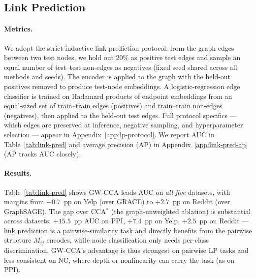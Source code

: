 \documentclass{article}
\begin{document}
\subsection{Link Prediction}
\paragraph{Metrics.}
We adopt the strict-inductive link-prediction protocol: from the graph
edges between two test nodes, we hold out 20\% as positive test edges
and sample an equal number of test--test non-edges as negatives (fixed
seed shared across all methods and seeds). The encoder is applied to the
graph with the held-out positives removed to produce test-node
embeddings. A logistic-regression edge classifier is trained on Hadamard
products of endpoint embeddings from an equal-sized set of train--train
edges (positives) and train--train non-edges (negatives), then applied
to the held-out test edges. Full protocol specifics --- which edges are
preserved at inference, negative sampling, and hyperparameter selection
--- appear in Appendix~\ref{app:lp-protocol}. We report AUC in
Table~\ref{tab:link-pred} and average precision (AP) in
Appendix~\ref{app:link-pred-ap} (AP tracks AUC closely).

\paragraph{Results.}
Table~\ref{tab:link-pred} shows GW-CCA leads AUC on \emph{all five}
datasets, with margins from $+0.7$~pp on Yelp (over GRACE) to $+2.7$~pp
on Reddit (over GraphSAGE). The gap over CCA$^\ast$ (the graph-unweighted
ablation) is substantial across datasets:
$+15.5$~pp AUC on PPI, $+7.4$~pp on Yelp, $+2.5$~pp on Reddit --- link
prediction is a pairwise-similarity task and directly benefits from the
pairwise structure $M_{ij}$ encodes, while node classification only
needs per-class discrimination. GW-CCA's advantage is
thus strongest on pairwise LP tasks and less consistent on NC, where
depth or nonlinearity can carry the task (as on PPI).
\end{document}
